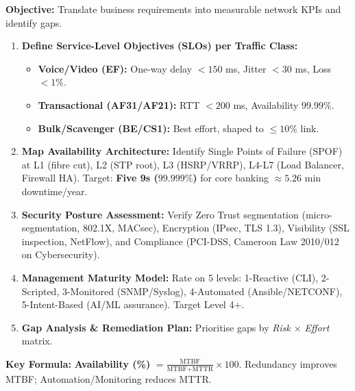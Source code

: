 \documentclass[11pt]{article}
\begin{document}
\begin{methode}
\textbf{Objective:} Translate business requirements into measurable network KPIs and identify gaps.
\begin{enumerate}
    \item \textbf{Define Service-Level Objectives (SLOs) per Traffic Class:}
    \begin{itemize}
        \item \textbf{Voice/Video (EF):} One-way delay $< 150$ ms, Jitter $< 30$ ms, Loss $< 1\%$.
        \item \textbf{Transactional (AF31/AF21):} RTT $< 200$ ms, Availability $99.99\%$.
        \item \textbf{Bulk/Scavenger (BE/CS1):} Best effort, shaped to $\le 10\%$ link.
    \end{itemize}
    \item \textbf{Map Availability Architecture:} Identify Single Points of Failure (SPOF) at L1 (fibre cut), L2 (STP root), L3 (HSRP/VRRP), L4-L7 (Load Balancer, Firewall HA). Target: \textbf{Five 9s ($99.999\%$)} for core banking $\approx 5.26$ min downtime/year.
    \item \textbf{Security Posture Assessment:} Verify Zero Trust segmentation (micro-segmentation, 802.1X, MACsec), Encryption (IPsec, TLS 1.3), Visibility (SSL inspection, NetFlow), and Compliance (PCI-DSS, Cameroon Law 2010/012 on Cybersecurity).
    \item \textbf{Management Maturity Model:} Rate on 5 levels: 1-Reactive (CLI), 2-Scripted, 3-Monitored (SNMP/Syslog), 4-Automated (Ansible/NETCONF), 5-Intent-Based (AI/ML assurance). Target Level 4+.
    \item \textbf{Gap Analysis \& Remediation Plan:} Prioritise gaps by \emph{Risk $\times$ Effort} matrix.
\end{enumerate}
\textbf{Key Formula:} \textbf{Availability (\%)} $= \frac{\text{MTBF}}{\text{MTBF} + \text{MTTR}} \times 100$. Redundancy improves MTBF; Automation/Monitoring reduces MTTR.
\end{methode}
\end{document}

